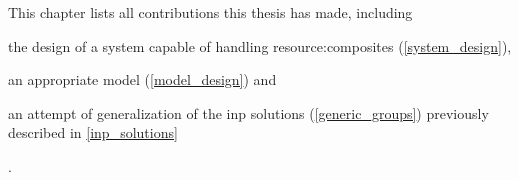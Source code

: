 This chapter lists all contributions this thesis has made, including
\begin{mylist}
    \item the design of a system capable of handling \glspl{resource:composite} (\autoref{system_design}),
    \item an appropriate \gls{model} (\autoref{model_design}) and
    \item an attempt of generalization of the \gls{inp} solutions (\autoref{generic_groups}) previously described in \autoref{inp_solutions}
\end{mylist}.